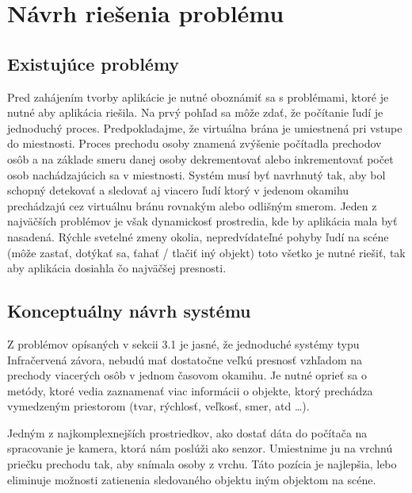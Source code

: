 \chapter{Návrh riešenia problému}
\section{Existujúce problémy}
Pred zahájením tvorby aplikácie je nutné oboznámiť sa s problémami, ktoré je nutné aby aplikácia riešila. Na prvý pohľad  sa môže zdať, že  počítanie ľudí je jednoduchý proces. Predpokladajme, že virtuálna brána je umiestnená pri vstupe do miestnosti. Proces prechodu osoby znamená zvýšenie počítadla prechodov osôb a na základe smeru danej osoby dekrementovať alebo inkrementovať počet osob nachádzajúcich sa v miestnosti. Systém musí byť navrhnutý tak, aby bol schopný detekovať a sledovať aj viacero ľudí ktorý v jedenom okamihu prechádzajú cez virtuálnu bránu rovnakým alebo odlišným smerom.  Jeden z najväčších problémov je však dynamickosť prostredia, kde by aplikácia mala byť nasadená. Rýchle svetelné zmeny okolia,  nepredvídateľné pohyby ľudí na scéne (môže zastať, dotýkať sa, ťahať / tlačiť iný objekt)  toto všetko je nutné riešiť, tak aby aplikácia dosiahla čo najväčšej presnosti. 

\section{Konceptuálny návrh systému}
Z problémov opísaných v sekcii 3.1 je jasné, že jednoduché systémy typu Infračervená závora, nebudú mať dostatočne veľkú presnosť vzhľadom na prechody viacerých osôb v jednom časovom okamihu. Je nutné oprieť sa o metódy, ktoré vedia zaznamenať viac informácii o objekte, ktorý prechádza vymedzeným priestorom (tvar, rýchlosť, veľkosť, smer, atd …). 

Jedným z najkomplexnejších prostriedkov, ako dostať dáta do počítača na spracovanie je kamera, ktorá nám poslúži ako senzor.  Umiestnime ju na vrchnú priečku prechodu tak, aby snímala osoby z vrchu. Táto pozícia je najlepšia, lebo eliminuje možnosti zatienenia sledovaného objektu iným objektom na scéne.  

